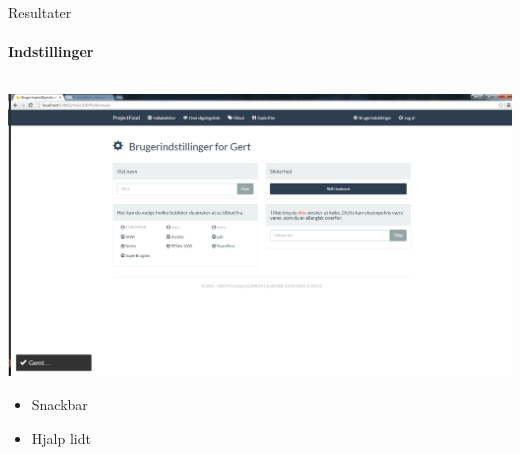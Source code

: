 \begin{frame}{Resultater}
\framesubtitle{Indstillinger}


	
	\begin{minipage}[0.3\textheight]{\textwidth}
	\begin{columns}[T]
	\begin{column}{1\textwidth}
	\vspace{-15 pt}
	 \includegraphics[width=1\textwidth,height=1\textheight,keepaspectratio, trim={1cm 0 0 16mm}, clip]{images/Screenshots/Settings.png}
	
	\begin{itemize}
		\item Snackbar
		\item Hjalp lidt
	\end{itemize}
	\end{column}

	\end{columns}

  \end{minipage}
	
\end{frame}
